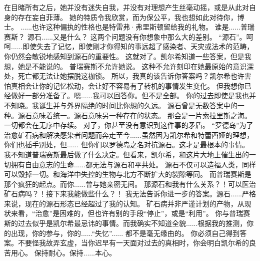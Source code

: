 \documentclass[openany]{book}
\begin{document}
\begin{dialogue}
     在目睹所有之后，她并没有迷失自我，并没有对理想产生丝毫动摇，或是从此对自身的存在妄自菲薄。
     她的特质令我欣赏，而为保公平，我也想如此对待你，博士。
     ......也许这种偏执的性格也是特雷弗·弗里斯顿留给我的礼物。
     谁是......普瑞赛斯？
     源石......又是什么？
     这两个问题没有你想象中那么大的差别。
     “源石”。呵呵......即使失去了记忆，即使刚才你得知的事远超了感染者、天灾或法术的范畴，你仍然会敏锐地感知到源石的重要性。
     这就对了。凯尔希知道一些答案，但是我想，她是不能说的。
     普瑞赛斯不允许她说。
     这种不允许刻印在她最原始的意识深处，死亡都无法让她摆脱这枷锁。
     所以，我真的该告诉你答案吗？凯尔希也许害怕真相会让你的记忆松动，会让好不容易有了转机的事情发生变化。
     但我想你已经做好一部分准备了。嗯......我可以回答你。但不是全部。
     你的过去即使是我也并不知晓。我诞生并与外界隔绝的时间比你想的久远。
     源石曾是无数答案中的一种。源石意味着统一。源石意味另一种存在的状态。
     那会是一片索拉里斯之海。一切都会在无序中存续。
     对了，你甚至没有意识到这件事的矛盾。
     “罗德岛”为了治愈矿石病和解决感染者问题而奔走至今......虽然因为凯尔希和特蕾西娅的理想，你们也插手别处，但......
     但你们以罗德岛之名对抗源石。这才是最根本的事情。
     我不知道普瑞赛斯最后做了什么决定。但看来，凯尔希，和这片大地上催生出的一切拥有自由意志的生命......都无法与源石和平共处。
     源石不仅可以造福人类，同样可以毁掉一切。和海洋中失控的生物与北方不断扩大的裂隙等同。
     而普瑞赛斯是那个疯狂的起点。而你......曾与她亲密无间。
     那源石和我有什么关系？！可以医治矿石病吗？！接下来我能做些什么？！
     我无法告诉你进一步的答案。源石......严格来说，现在的源石形态已经超过了我的认知。
     矿石病并非严谨计划的产物，从现状来看，“治愈”是困难的，但也许有别的手段“停止”，或是“利用”。
     你与普瑞赛斯的过去似乎是凯尔希最忌讳的事情。而我确实不知道全貌......根据我的推测，你的出现，你的参与，你的......“失忆”......
     都不是毫无缘由的。
     你必须自己得到答案。不要怪我故弄玄虚，当你迟早有一天面对过去的真相时，你会明白凯尔希的良苦用心。
     保持耐心。保持......本心。
\end{dialogue}
\end{document}
